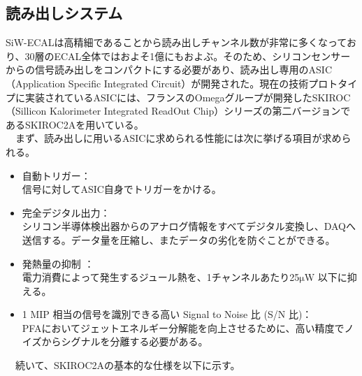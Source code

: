 \subsection{読み出しシステム}
 SiW-ECALは高精細であることから読み出しチャンネル数が非常に多くなっており、30層のECAL全体ではおよそ1億にもおよぶ。そのため、シリコンセンサーからの信号読み出しをコンパクトにする必要があり、読み出し専用のASIC（Application Specific Integrated Circuit）が開発された。現在の技術プロトタイプに実装されているASICには、フランスのOmegaグループが開発したSKIROC（Sillicon Kalorimeter Integrated ReadOut Chip）シリーズの第二バージョンであるSKIROC2Aを用いている。\\
　まず、読み出しに用いるASICに求められる性能には次に挙げる項目が求められる。
 \begin{itemize}
	\item 自動トリガー：\\
		信号に対してASIC自身でトリガーをかける。
	\item 完全デジタル出力：\\
		 シリコン半導体検出器からのアナログ情報をすべてデジタル変換し、DAQへ送信する。データ量を圧縮し、またデータの劣化を防ぐことができる。
	\item 発熱量の抑制 ：\\
		電力消費によって発生するジュール熱を、1チャンネルあたり25$\mathrm{\mu W}$ 以下に抑える。
	\item 1 MIP 相当の信号を識別できる高い Signal to Noise 比 (S/N 比)：\\
		PFAにおいてジェットエネルギー分解能を向上させるために、高い精度でノイズからシグナルを分離する必要がある。
 \end{itemize}
　続いて、SKIROC2Aの基本的な仕様を以下に示す。

